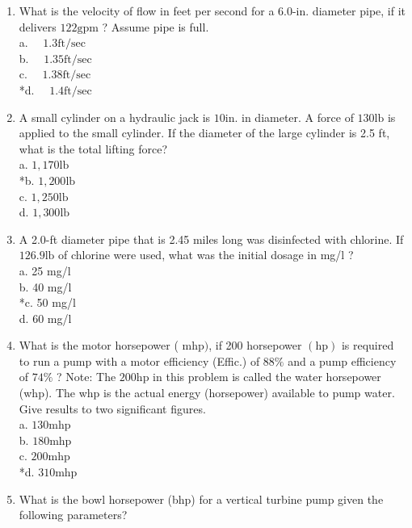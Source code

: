 \begin{enumerate}
  \item What is the velocity of flow in feet per second for a 6.0-in. diameter pipe, if it delivers $122 \mathrm{gpm}$ ? Assume pipe is full.\\
a. $\quad 1.3 \mathrm{ft} / \mathrm{sec}$\\
b. $\quad 1.35 \mathrm{ft} / \mathrm{sec}$\\
c. $\quad 1.38 \mathrm{ft} / \mathrm{sec}$\\
*d. $\quad 1.4 \mathrm{ft} / \mathrm{sec}$\\
  \item A small cylinder on a hydraulic jack is $10 \mathrm{in}$. in diameter. A force of $130 \mathrm{lb}$ is applied to the small cylinder. If the diameter of the large cylinder is 2.5 ft, what is the total lifting force?\\
a. $1,170 \mathrm{lb}$\\
*b. $1,200 \mathrm{lb}$\\
c. $1,250 \mathrm{lb}$\\
d. $1,300 \mathrm{lb}$\\
  \item A 2.0-ft diameter pipe that is 2.45 miles long was disinfected with chlorine. If $126.9 \mathrm{lb}$ of chlorine were used, what was the initial dosage in mg/l ?\\
a. 25 mg/l\\
b. 40 mg/l\\
*c. 50 mg/l\\
d. 60 mg/l\\
  \item What is the motor horsepower ( $\mathrm{mhp})$, if 200 horsepower $(\mathrm{hp})$ is required to run a pump with a motor efficiency (Effic.) of $88 \%$ and a pump efficiency of $74 \%$ ? Note: The $200 \mathrm{hp}$ in this problem is called the water horsepower (whp). The whp is the actual energy (horsepower) available to pump water. Give results to two significant figures.\\
a. $130 \mathrm{mhp}$\\
b. $180 \mathrm{mhp}$\\
c. $200 \mathrm{mhp}$\\
*d. $310 \mathrm{mhp}$\\
  \item What is the bowl horsepower (bhp) for a vertical turbine pump given the following parameters?\\
\begin{itemize}

\end{itemize}
\end{enumerate}
